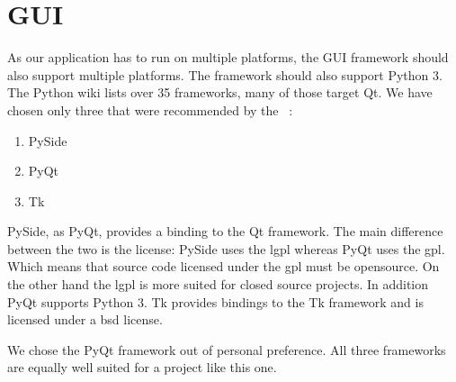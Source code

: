 \section{GUI}

As our application has to run on multiple platforms, the GUI framework should
also support multiple platforms. The framework should also support Python 3. The
Python wiki lists over 35 frameworks, many of those target Qt. We have chosen
only three that were recommended by the
~\cite{schlusser2016hitchhikers}:

\begin{enumerate}
    \item PySide
    \item PyQt
    \item Tk
\end{enumerate}

PySide, as PyQt, provides a binding to the Qt framework. The main difference
between the two is the license: PySide uses the \acrfull{lgpl} whereas PyQt uses
the \acrfull{gpl}. Which means that source code licensed under the
\acrshort{gpl} must be opensource. On the other hand the
\acrshort{lgpl} is more suited for closed source projects. In addition PyQt
supports Python 3. Tk provides bindings to the Tk framework and is licensed
under a \acrfull{bsd} license.

We chose the PyQt framework out of personal preference. All three frameworks
are equally well suited for a project like this one.



